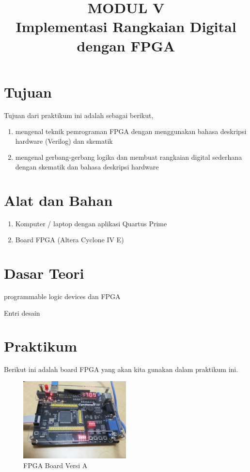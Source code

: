 \documentclass[a4paper,12pt,bahasa]{extarticle}
\begin{document}
\title{MODUL V \\
Implementasi Rangkaian Digital dengan FPGA}
\author{}
\date{}
\maketitle

\section{Tujuan}

Tujuan dari praktikum ini adalah sebagai berikut,
\begin{enumerate}
\item mengenal teknik pemrograman FPGA dengan menggunakan bahasa deskripsi hardware (Verilog)
dan skematik
\item mengenal gerbang-gerbang logika dan membuat rangkaian digital sederhana dengan
skematik dan bahasa deskripsi hardware
\end{enumerate}



\section{Alat dan Bahan}

\begin{enumerate}
\item Komputer / laptop dengan aplikasi Quartus Prime
\item Board FPGA (Altera Cyclone IV E)
\end{enumerate}

\section{Dasar Teori}

programmable logic devices dan FPGA

Entri desain





\section{Praktikum}

Berikut ini adalah board FPGA yang akan kita gunakan dalam praktikum ini.

\begin{figure}[H]
{\centering
\includegraphics[width=0.5\textwidth]{images/foto_FPGA_v1.jpg}
\par}
\caption{FPGA Board Versi A}
\end{figure}
\end{document}
